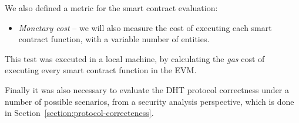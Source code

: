 \begin{table}[h!]
\centering
{}
\caption{Test scenarios}
\label{table:test-scenarios}
\end{table}

We also defined a metric for the smart contract evaluation:

\begin{itemize}
  \item \textit{Monetary cost} – we will also measure the cost of executing each smart contract function, with a variable number of entities.
\end{itemize}

This test was executed in a local machine, by calculating the \textit{gas} cost of executing every smart contract function in the \ac{EVM}.

Finally it was also necessary to evaluate the DHT protocol correctness under a number of possible scenarios, from a security analysis perspective, which is done in Section~\ref{section:protocol-correcteness}.

